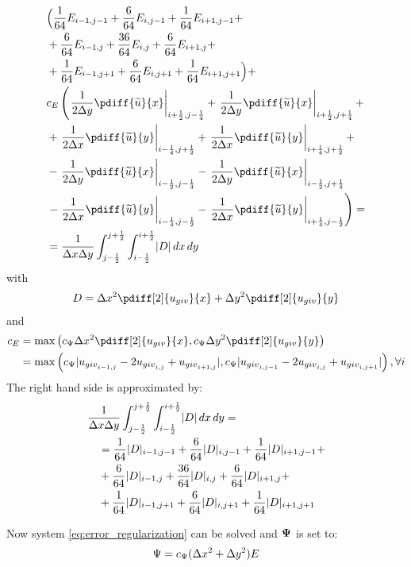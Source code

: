 \begin{align}
        &  \Bigl( \frac{1}{64} E_{i-1,j-1} + \frac{6}{64} E_{i,j-1} + \frac{1}{64} E_{i+1,j-1} +
    \nonumber \\
    & + \frac{6}{64} E_{i-1,j} + \frac{36}{64} E_{i,j} + \frac{6}{64} E_{i+1,j} +
    \nonumber \\
    &  + \frac{1}{64} E_{i-1,j+1} +\frac{6}{64} E_{i,j+1} + \frac{1}{64} E_{i+1,j+1} \Bigl) +
    \nonumber \\
    &
    c_E \left(
      \left. \frac{1}{2\Dy}  \pdiff{\widetilde{u}}{x}  \right|_{i+\half,j-\quart}
    + \left. \frac{1}{2\Dy}  \pdiff{\widetilde{u}}{x}  \right|_{i+\half,j+\quart} +
    \right. \\
    &
    + \left. \frac{1}{2\Dx}  \pdiff{\widetilde{u}}{y}  \right|_{i-\quart,j+\half}
    + \left. \frac{1}{2\Dx}  \pdiff{\widetilde{u}}{y}  \right|_{i+\quart,j+\half} +
    \\
    &
    - \left. \frac{1}{2\Dy}  \pdiff{\widetilde{u}}{x}  \right|_{i-\half,j-\quart}
    - \left. \frac{1}{2\Dy}  \pdiff{\widetilde{u}}{x}  \right|_{i-\half,j+\quart}
    \\
    &
    \left.
    - \left. \frac{1}{2\Dx}  \pdiff{\widetilde{u}}{y}   \right|_{i-\quart,j-\half}
    - \left. \frac{1}{2\Dx}  \pdiff{\widetilde{u}}{y}   \right|_{i+\quart,j-\half}
    \right)
    =
    \nonumber \\
    & = \frac{1}{\Dx\Dy} \int_{j-\half}^{j+\half} \int_{i-\half}^{i+\half} \abs{D} \, dx\, dy
    \label{eq:error_regularization}
\end{align}
with \citep[eq.\ 2]{Borsboom1998}
\begin{align}
    D = \Dx^2 \pdiff[2]{u_{giv}}{x} + \Dy^2 \pdiff[2]{u_{giv}}{y}
\end{align}
and
\begin{align}
    c_E & = \max \left(  c_{\Psi}\Dx^2 \pdiff[2]{u_{giv}}{x},  c_{\Psi}\Dy^2 \pdiff[2]{u_{giv}}{y} \right)
    \nonumber \\
    & =  \max\left(
      c_{\Psi}\abs{u_{{giv}_{i-1,j}} -2 u_{{giv}_{i,j}} + u_{{giv}_{i+1,j}}},
      c_{\Psi}\abs{u_{{giv}_{i,j-1}} -2 u_{{giv}_{i,j}} + u_{{giv}_{i,j+1}}}
    \right), \forall i
\end{align}
The right hand side is approximated by:
\begin{align}
    & \frac{1}{\Delta x\Delta y} \int_{j-\frac{1}{2}}^{j+\frac{1}{2}} \int_{i-\frac{1}{2}}^{i+\frac{1}{2}} \lvert D \rvert \, dx\, dy
    =
\nonumber \\
& \quad =  \frac{1}{64} \lvert D \rvert_{i-1,j-1} +
\frac{6}{64} \lvert D \rvert_{i,j-1} +
\frac{1}{64} \lvert D \rvert_{i+1,j-1} +
\nonumber \\
    & \quad +
\frac{6}{64} \lvert D \rvert_{i-1,j} +
\frac{36}{64} \lvert D \rvert_{i,j} +
\frac{6}{64} \lvert D \rvert_{i+1,j} +
\nonumber \\
& \quad + \frac{1}{64} \lvert D \rvert_{i-1,j+1} +
\frac{6}{64} \lvert D \rvert_{i,j+1} +
\frac{1}{64} \lvert D \rvert_{i+1,j+1}
\end{align}

Now system \autoref{eq:error_regularization} can be solved and $\boldsymbol{\Psi}$ is set to:
\begin{align}
    \Psi = c_{\Psi}(\Delta x^2 + \Delta y^2) E
\end{align}